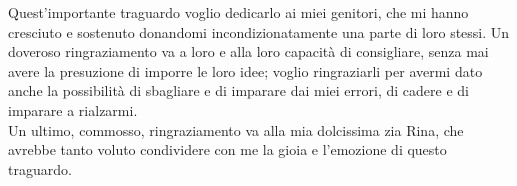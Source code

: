 Quest'importante traguardo voglio dedicarlo ai miei genitori, che mi hanno cresciuto e sostenuto donandomi  incondizionatamente una parte di loro stessi. Un doveroso ringraziamento va a loro e alla loro capacità di consigliare, senza mai avere la presuzione di imporre le loro idee; voglio ringraziarli per avermi dato anche la possibilità di sbagliare e di imparare dai miei errori, di cadere e di imparare a rialzarmi.\\
Un ultimo, commosso, ringraziamento va alla mia dolcissima zia Rina, che avrebbe tanto voluto condividere con me la gioia e l'emozione di questo traguardo.